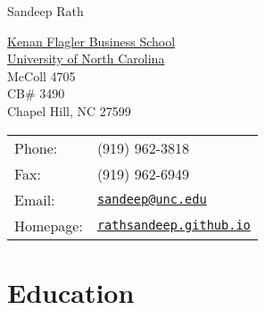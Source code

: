 \documentclass[11pt,a4paper]{article}
\def\name{Sandeep Rath}
\renewenvironment{itemize}{
	\begin{list}{}{
			\setlength{\leftmargin}{1.5em}
		}
	}{
\end{list}
}
\begin{document}
	{\huge \name}


	\vspace{0.25in}

	\begin{minipage}{0.45\linewidth}
		\href{http://www.unc.edu/}{
			Kenan Flagler Business School\\
			University of North Carolina} \\
		McColl 4705 \\
		CB\# 3490 \\
		Chapel Hill, NC 27599
	\end{minipage}
	\begin{minipage}{0.45\linewidth}
		\begin{tabular}{ll}
			Phone: & (919) 962-3818 \\
			Fax: &  (919) 962-6949 \\
			Email: & \href{mailto:sandeep@unc.edu}{\tt sandeep@unc.edu} \\
			Homepage: & \href{https://rathsandeep.github.io/}{\tt rathsandeep.github.io}\\
		\end{tabular}
	\end{minipage}





	\section*{\textbf{Education}}
\end{document}
